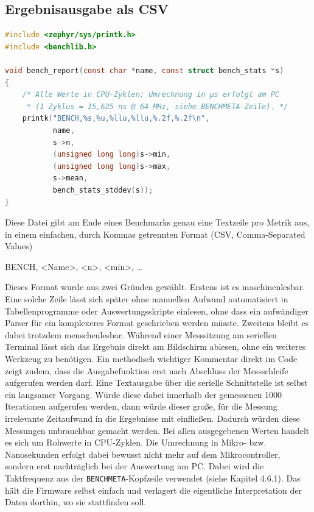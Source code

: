 \subsection{Ergebnisausgabe als CSV}
\begin{lstlisting}[style=basecode,language=C]
#include <zephyr/sys/printk.h>
#include <benchlib.h>

void bench_report(const char *name, const struct bench_stats *s)
{
	/* Alle Werte in CPU-Zyklen; Umrechnung in µs erfolgt am PC
	 * (1 Zyklus = 15,625 ns @ 64 MHz, siehe BENCHMETA-Zeile). */
	printk("BENCH,%s,%u,%llu,%llu,%.2f,%.2f\n",
	       name,
	       s->n,
	       (unsigned long long)s->min,
	       (unsigned long long)s->max,
	       s->mean,
	       bench_stats_stddev(s));
}
\end{lstlisting}
Diese Datei gibt am Ende eines Benchmarks genau eine Textzeile pro Metrik aus, in einem einfachen, durch Kommas getrennten Format (CSV, Comma-Separated Values)

BENCH, <Name>, <n>, <min>, …

Dieses Format wurde aus zwei Gründen gewählt. Erstens ist es maschinenlesbar. Eine solche Zeile lässt sich später ohne manuellen Aufwand automatisiert in Tabellenprogramme oder Auswertungsskripte einlesen, ohne dass ein aufwändiger Parser für ein komplexeres Format geschrieben werden müsste. Zweitens bleibt es dabei trotzdem menschenlesbar. Während einer Messsitzung am seriellen Terminal lässt sich das Ergebnis direkt am Bildschirm ablesen, ohne ein weiteres Werkzeug zu benötigen. Ein methodisch wichtiger Kommentar direkt im Code zeigt zudem, dass die Ausgabefunktion erst nach Abschluss der Messschleife aufgerufen werden darf. Eine Textausgabe über die serielle Schnittstelle ist selbst ein langsamer Vorgang. Würde diese dabei innerhalb der gemessenen 1000 Iterationen aufgerufen werden, dann würde dieser große, für die Messung irrelevante Zeitaufwand in die Ergebnisse mit einfließen. Dadurch würden diese Messungen unbrauchbar gemacht werden. Bei allen ausgegebenen Werten handelt es sich um Rohwerte in CPU-Zyklen. Die Umrechnung in Mikro- bzw. Nanosekunden erfolgt dabei bewusst nicht mehr auf dem Mikrocontroller, sondern erst nachträglich bei der Auswertung am PC. Dabei wird die Taktfrequenz aus der \lstinline[style=fileinline]|BENCHMETA|-Kopfzeile verwendet (siehe Kapitel 4.6.1). Das hält die Firmware selbst einfach und verlagert die eigentliche Interpretation der Daten dorthin, wo sie stattfinden soll.

